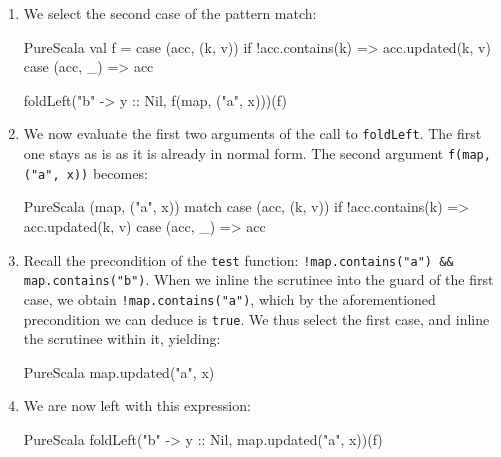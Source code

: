 \documentclass[a4paper,twoside]{article}
\newcommand{\InlineS}[1]{\lstinline[language=PureScala,basicstyle=\small\ttfamily,columns=fixed]|#1|}
\newcommand{\stt}[1]{\texttt{\small{#1}}}
\begin{document}
\begin{enumerate}
\begin{ShortCode}{PureScala}
val f = {
  case (acc, (k, v)) if !acc.contains(k) => acc.updated(k, v)
  case (acc, _)                          => acc
}

(("a", x) :: ("b", y) :: Nil) match {
  case Nil     => map
  case x :: xs => foldLeft(xs, f(z, x))(f)
}
\end{ShortCode}

For legibility, we have assigned the supplied match expression to a variable instead of inlining it straight away.

\item We select the second case of the pattern match:

\begin{ShortCode}{PureScala}
val f = {
  case (acc, (k, v)) if !acc.contains(k) => acc.updated(k, v)
  case (acc, _)                          => acc
}

foldLeft("b" -> y :: Nil, f(map, ("a", x)))(f)
\end{ShortCode}

\clearpage

\item We now evaluate the first two arguments of the call to \stt{foldLeft}. The first one stays as is as it is already in normal form. The second argument \InlineS{f(map, ("a", x))} becomes:

\begin{ShortCode}{PureScala}
(map, ("a", x)) match {
  case (acc, (k, v)) if !acc.contains(k) => acc.updated(k, v)
  case (acc, _)                          => acc
}
\end{ShortCode}

\item Recall the precondition of the \stt{test} function: \InlineS{!map.contains("a") && map.contains("b")}. When we inline the scrutinee into the guard of the first case, we obtain \InlineS{!map.contains("a")}, which by the aforementioned precondition we can deduce is \InlineS{true}. We thus select the first case, and inline the scrutinee within it, yielding:

\begin{ShortCode}{PureScala}
map.updated("a", x)
\end{ShortCode}

\item We are now left with this expression:

\begin{ShortCode}{PureScala}
foldLeft("b" -> y :: Nil, map.updated("a", x))(f)
\end{ShortCode}


\end{enumerate}
\end{document}
